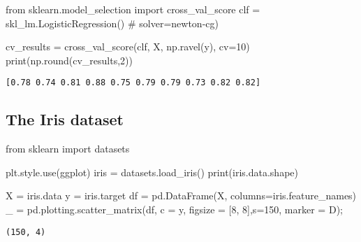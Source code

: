 \documentclass[
  letterpaper,
  DIV=11,
  numbers=noendperiod]{scrreprt}
\newenvironment{Shaded}{\begin{snugshade}}{\end{snugshade}}
\newcommand{\BuiltInTok}[1]{\textcolor[rgb]{0.00,0.23,0.31}{#1}}
\newcommand{\CommentTok}[1]{\textcolor[rgb]{0.37,0.37,0.37}{#1}}
\newcommand{\DecValTok}[1]{\textcolor[rgb]{0.68,0.00,0.00}{#1}}
\newcommand{\ImportTok}[1]{\textcolor[rgb]{0.00,0.46,0.62}{#1}}
\newcommand{\NormalTok}[1]{\textcolor[rgb]{0.00,0.23,0.31}{#1}}
\newcommand{\OperatorTok}[1]{\textcolor[rgb]{0.37,0.37,0.37}{#1}}
\newcommand{\StringTok}[1]{\textcolor[rgb]{0.13,0.47,0.30}{#1}}
\begin{document}
\begin{Shaded}
\begin{Highlighting}[]
\ImportTok{from}\NormalTok{ sklearn.model\_selection }\ImportTok{import}\NormalTok{ cross\_val\_score}
\NormalTok{clf }\OperatorTok{=}\NormalTok{ skl\_lm.LogisticRegression() }\CommentTok{\# solver=\textquotesingle{}newton{-}cg\textquotesingle{})}

\NormalTok{cv\_results }\OperatorTok{=}\NormalTok{ cross\_val\_score(clf, X, np.ravel(y), cv}\OperatorTok{=}\DecValTok{10}\NormalTok{)}
\BuiltInTok{print}\NormalTok{(np.}\BuiltInTok{round}\NormalTok{(cv\_results,}\DecValTok{2}\NormalTok{))}
\end{Highlighting}
\end{Shaded}

\begin{verbatim}
[0.78 0.74 0.81 0.88 0.75 0.79 0.79 0.73 0.82 0.82]
\end{verbatim}

\hypertarget{the-iris-dataset}{%
\subsection{The Iris dataset}\label{the-iris-dataset}}

\begin{Shaded}
\begin{Highlighting}[]
\ImportTok{from}\NormalTok{ sklearn }\ImportTok{import}\NormalTok{ datasets}

\NormalTok{plt.style.use(}\StringTok{\textquotesingle{}ggplot\textquotesingle{}}\NormalTok{)}
\NormalTok{iris }\OperatorTok{=}\NormalTok{ datasets.load\_iris()}
\BuiltInTok{print}\NormalTok{(iris.data.shape)}

\NormalTok{X }\OperatorTok{=}\NormalTok{ iris.data}
\NormalTok{y }\OperatorTok{=}\NormalTok{ iris.target}
\NormalTok{df }\OperatorTok{=}\NormalTok{ pd.DataFrame(X, columns}\OperatorTok{=}\NormalTok{iris.feature\_names)}
\NormalTok{\_ }\OperatorTok{=}\NormalTok{ pd.plotting.scatter\_matrix(df, c }\OperatorTok{=}\NormalTok{ y, figsize }\OperatorTok{=}\NormalTok{ [}\DecValTok{8}\NormalTok{, }\DecValTok{8}\NormalTok{],s}\OperatorTok{=}\DecValTok{150}\NormalTok{, marker }\OperatorTok{=} \StringTok{\textquotesingle{}D\textquotesingle{}}\NormalTok{)}\OperatorTok{;}
\end{Highlighting}
\end{Shaded}

\begin{verbatim}
(150, 4)
\end{verbatim}
\end{document}

